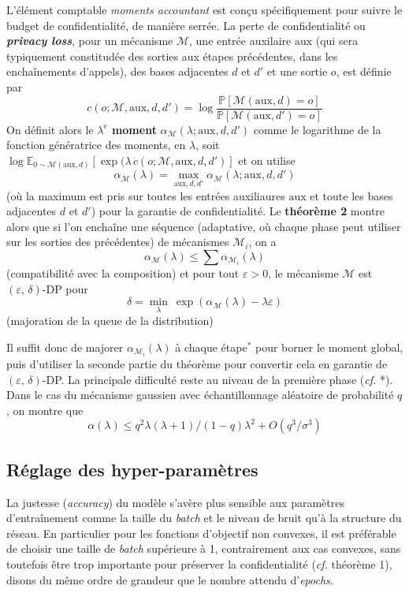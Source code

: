 \documentclass[a4paper,11pt]{article} %
\newcommand{\evid}[1]{\colorbox{blue!10}{\textbf{#1}}}
\begin{document}
L'élément comptable \emph{moments accountant} est conçu spécifiquement pour suivre le budget de confidentialité, de manière \og serrée\fg{}. La perte de confidentialité ou \evid{\emph{privacy loss}}, pour un mécanisme $\mathcal{M}$, une entrée auxilaire $\text{aux}$ (qui sera typiquement constitudée des sorties aux étapes précédentes, dans les enchaînements d'appels), des bases adjacentes $d$ et $d'$ et une sortie $o$, est définie par
\[c(o; \mathcal{M},\text{aux}, d, d')=\log\frac{\mathbb{P}[\mathcal{M}(\text{aux}, d)=o]}{\mathbb{P}[\mathcal{M}(\text{aux}, d')=o]} \]
On définit alors le \evid{$\lambda^\text{e}$ moment} $\alpha_\mathcal{M}(\lambda; \text{aux}, d, d')$ comme le logarithme de la fonction génératrice des moments, en $\lambda$, soit $\log \mathbb{E}_{0\sim\mathcal{M}(\text{aux},d)} [\exp(\lambda\, c(o; \mathcal{M},\text{aux}, d, d')]$ et on utilise
\[ \alpha_\mathcal{M}(\lambda)=\max_{\text{aux}, d, d'} \alpha_\mathcal{M}(\lambda; \text{aux}, d, d') \]
 (où la maximum est pris sur toutes les entrées auxiliaures $\text{aux}$ et toute les bases adjacentes $d$ et $d'$) pour la garantie de confidentialité. Le \textbf{théorème 2} montre alors que si l'on enchaîne une séquence (\og adaptative\fg{}, où chaque phase peut utiliser sur les sorties des précédentes) de mécanismes $\mathcal{M}_i$, on a
 \[\alpha_\mathcal{M}(\lambda) \leqslant \sum \alpha_{\mathcal{M}_i}(\lambda)\]
 \centering(compatibilité avec la composition)\justify
  et pour tout $\varepsilon > 0$, le mécanisme $\mathcal{M}$ est $(\varepsilon,\, \delta)$-DP pour
 \[ \delta = \min_\lambda\   \exp(\alpha_\mathcal{M} (\lambda)-\lambda \varepsilon) \]
\centering(majoration de la queue de la distribution)\justify

Il suffit donc de majorer $\alpha_{\mathcal{M}_i}(\lambda)$ à chaque étape$^*$ pour borner le moment global, puis d'utiliser la seconde partie du théorème pour convertir cela en garantie de $(\varepsilon,\, \delta)$-DP. La principale difficulté reste au niveau de la première phase (\emph{cf. }*).
Dans le cas du mécanisme gaussien avec échantillonnage aléatoire de probabilité $q$, on montre que
\[ \alpha(\lambda) \leqslant q^2 \lambda (\lambda+1) / (1-q)\lambda^2 + O(q^3/\sigma^3)  \]
%
\subsection{Réglage des hyper-paramètres}
%
La justesse (\emph{accuracy}) du modèle s'avère plus sensible aux paramètres d'entraînement comme la taille du \emph{batch} et le niveau de bruit qu'à la structure du réseau. En particulier pour les fonctions d'objectif non convexes, il est préférable de choisir une taille de \emph{batch} supérieure à 1, contrairement aux cas convexes, sans toutefois être trop importante pour préserver la confidentialité (\emph{cf.} théorème 1), disons du même ordre de grandeur que le nombre attendu d'\emph{epochs}.
\end{document}
